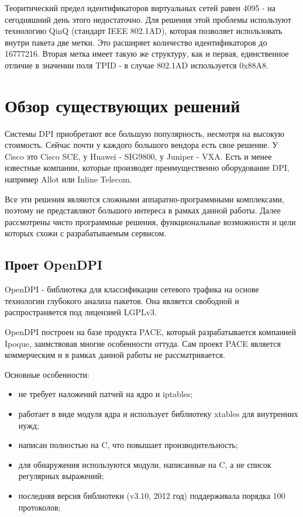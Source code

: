 Теоритический предел идентификаторов виртуальных сетей равен 4095 - на сегодняшний день этого недостаточно. Для решения этой проблемы используют технологию QinQ (стандарт IEEE 802.1AD), которая позволяет использовать внутри пакета две метки. Это расширяет количество идентификаторов до 16777216. Вторая метка имеет такую же структуру, как и первая, единственное отличие в значении поля TPID - в случае 802.1AD используется 0x88A8.


\section{Обзор существующих решений}
Системы DPI приобретают все большую популярность, несмотря на высокую стоимость. Сейчас почти у каждого большого вендора есть свое решение. У Cisco это Cisco SCE, у Huawei - SIG9800, у Juniper - VXA. Есть и менее известные компании, которые производят преимущественно оборудование DPI, например Allot или Inline Telecom.

Все эти решения являются сложными аппаратно-программными комплексами, поэтому не представляют большого интереса в рамках данной работы. Далее рассмотрены чисто программные решения, функциональные возможности  и цели которых схожи с разрабатываемым сервисом.
\subsection{Проет OpenDPI}
OpenDPI - библиотека для классификации сетевого трафика на основе технологии глубокого анализа пакетов. Она является свободной и распространяется под лицензией LGPLv3.

OpenDPI построен на базе продукта PACE, который разрабатывается компанией Ipoque, заимствовав многие особенности оттуда. Сам проект PACE является коммерческим и в рамках данной работы не рассматривается.

Основные особенности:
\begin{itemize}
\item не требует наложений патчей на ядро и iptables;
\item работает в виде модуля ядра и использует библиотеку xtables для внутренних нужд;
\item написан полностью на C, что повышает производительность;
\item для обнаружения используются модули, написанные на C, а не список регулярных выражений;
\item последняя версия библиотеки (v3.10, 2012 год) поддерживала порядка 100 протоколов;
\end{itemize}

